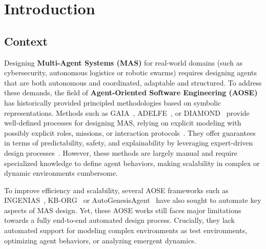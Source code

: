 \documentclass[pdflatex,sn-mathphys-num]{sn-jnl}%
\theoremstyle{thmstyleone}%
\theoremstyle{thmstyletwo}%
\theoremstyle{thmstylethree}%
\begin{document}




\maketitle



\section{Introduction}

\subsection{Context}

Designing \textbf{Multi-Agent Systems (MAS)} for real-world domains (such as cybersecurity, autonomous logistics or robotic swarms) requires designing agents that are both autonomous and coordinated, adaptable and structured. To address these demands, the field of \textbf{Agent-Oriented Software Engineering (AOSE)} has historically provided principled methodologies based on symbolic representations. Methods such as GAIA~\cite{gaia1998}, ADELFE~\cite{adelfe2002}, or DIAMOND~\cite{Jamont2005} provide well-defined processes for designing MAS, relying on explicit modeling with possibly explicit roles, missions, or interaction protocols~\cite{Pavon2003,Bernon2005}. They offer guarantees in terms of predictability, safety, and explainability by leveraging expert-driven design processes~\cite{Hindriks2014,Jamont2O15}. However, these methods are largely manual and require specialized knowledge to define agent behaviors, making scalability in complex or dynamic environments cumbersome.

To improve efficiency and scalability, several AOSE frameworks such as INGENIAS~\cite{Pavon2003}, KB-ORG~\cite{Sims2008} or AutoGenesisAgent~\cite{harper2024autogenesisagent} have also sought to automate key aspects of MAS design.
Yet, these AOSE works still faces major limitations towards a fully end-to-end automated design process. Crucially, they lack automated support for modeling complex environments as test environments, optimizing agent behaviors, or analyzing emergent dynamics.
\end{document}
